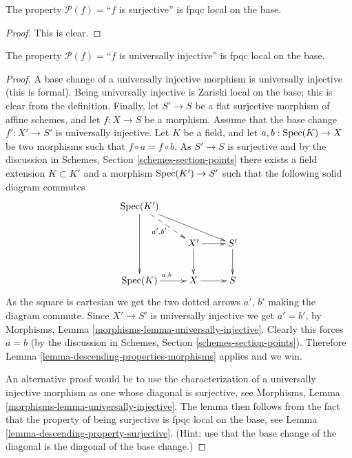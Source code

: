 \begin{lemma}
\label{lemma-descending-property-surjective}
The property $\mathcal{P}(f) =$``$f$ is surjective''
is fpqc local on the base.
\end{lemma}

\begin{proof}
This is clear.
\end{proof}

\begin{lemma}
\label{lemma-descending-property-universally-injective}
The property $\mathcal{P}(f) =$``$f$ is universally injective''
is fpqc local on the base.
\end{lemma}

\begin{proof}
A base change of a universally injective morphism is universally
injective (this is formal). Being universally injective is Zariski
local on the base; this is clear from the definition.
Finally, let
$S' \to S$ be a flat surjective morphism of affine schemes,
and let $f : X \to S$ be a morphism. Assume that the base change
$f' : X' \to S'$ is universally injective. Let $K$ be a field, and let
$a, b : \mathop{\rm Spec}(K) \to X$ be two morphisms such that
$f \circ a = f \circ b$. As $S' \to S$ is surjective and
by the discussion in Schemes,
Section \ref{schemes-section-points} there exists a field
extension $K \subset K'$ and a morphism $\mathop{\rm Spec}(K')
\to S'$ such that the following solid diagram commutes
$$
\xymatrix{
\Spec(K') \ar[rrd] \ar@{-->}[rd]_{a', b'} \ar[dd] \\
 &
X' \ar[r] \ar[d] &
S' \ar[d] \\
\Spec(K) \ar[r]^{a, b} &
X \ar[r] &
S
}
$$
As the square is cartesian we get the two dotted arrows $a'$, $b'$ making the
diagram commute. Since $X' \to S'$ is universally injective we get $a' = b'$,
by
Morphisms, Lemma \ref{morphisms-lemma-universally-injective}.
Clearly this forces $a = b$ (by the discussion in Schemes,
Section \ref{schemes-section-points}).
Therefore Lemma \ref{lemma-descending-properties-morphisms} applies and we win.

\medskip\noindent
An alternative proof would be to use the characterization of a universally
injective morphism as one whose diagonal is surjective, see
Morphisms, Lemma \ref{morphisms-lemma-universally-injective}.
The lemma then follows from the fact that
the property of being surjective is fpqc local on the base, see
Lemma \ref{lemma-descending-property-surjective}.
(Hint: use that the base change of the diagonal is the diagonal
of the base change.)
\end{proof}

